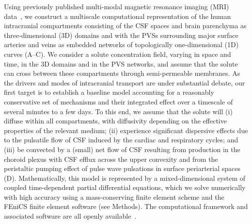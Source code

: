 \documentclass[fleqn,10pt]{wlscirep}
\begin{document}
Using previously published multi-modal magnetic resonance imaging (MRI)
data~\cite{hodneland2019new, deistung2009tof,
  schweser2012quantitative, reichenbach2012future,
  deistung2017overview}, we construct a multiscale computational
representation of the human intracranial compartments consisting of
the CSF spaces and brain parenchyma as three-dimensional (3D) domains
and with the PVSs surrounding major surface arteries and veins as
embedded networks of topologically one-dimensional (1D) curves
(A--C). We consider a solute concentration field,
varying in space and time, in the 3D domains and in the PVS networks,
and assume that the solute can cross between these compartments
through semi-permeable membranes. As the drivers and modes of
intracranial transport are under substantial
debate\cite{smith2019going, proulx2021cerebrospinal,
  bohr2022glymphatic, hladky2022glymphatic, betsholtz2024advances},
our first target is to establish a baseline model accounting for a
reasonably conservative set of mechanisms and their integrated effect
over a timescale of several minutes to a few days. To this end, we
assume that the solute will (i) diffuse within all compartments, with
diffusivity depending on the effective properties of the relevant
medium\cite{sykova2008diffusion}; (ii) experience significant
dispersive effects due to the pulsatile flow of CSF induced by the
cardiac and respiratory cycles\cite{vinje2019respiratory,
  keith2019dispersion, ray2021quantitative, troyetsky2021dispersion};
and (iii) be convected by a (small) net flow of CSF resulting from
production in the choroid plexus with CSF efflux across the upper
convexity\cite{hornkjol2022csf} and from the peristaltic pumping
effect of pulse wave pulsations in surface periarterial
spaces~\cite{mestre2018flow, gjerde2023directional}
(D). Mathematically, this model is represented by a
mixed-dimensional system of coupled time-dependent partial
differential equations\cite{masri2024modelling}, which we solve
numerically with high accuracy using a mass-conserving finite element
scheme and the FEniCS finite element software\cite{alnaes2015fenics,
  kuchta2020assembly} (see Methods). The computational framework and
associated software are all openly available~\cite{ZENODO}.
\end{document}
